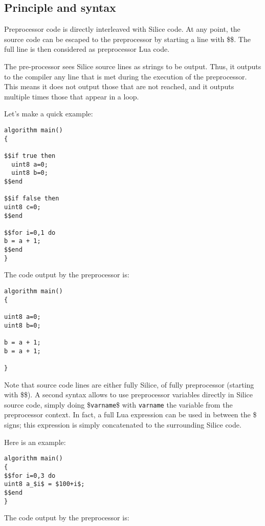 \documentclass[a4]{article}
\begin{document}
\subsection{Principle and syntax}

Preprocessor code is directly interleaved with Silice code. At any point, the source code can be escaped to the preprocessor by starting a line with \$\$. The full line is then considered as preprocessor Lua code. 

The pre-processor sees Silice source lines as strings to be output. 
Thus, it outputs to the compiler any line that is met during the execution
of the preprocessor. This means it does not output those that are not reached, and
it outputs multiple times those that appear in a loop.

Let's make a quick example:

\begin{verbatim}
algorithm main()
{

$$if true then
  uint8 a=0;
  uint8 b=0;
$$end

$$if false then
uint8 c=0;
$$end

$$for i=0,1 do
b = a + 1;
$$end
}
\end{verbatim}

The code output by the preprocessor is:

\begin{verbatim}
algorithm main()
{

uint8 a=0;
uint8 b=0;

b = a + 1;
b = a + 1;

}
\end{verbatim}

Note that source code lines are either fully Silice, of fully preprocessor (starting with \$\$). A second syntax allows to use preprocessor variables directly in Silice source code, simply doing \$\texttt{varname}\$ with \texttt{varname} the variable from the preprocessor context. In fact, a full Lua expression can be used in between the \$ signs; this expression is simply concatenated to the surrounding Silice code.

Here is an example:

\begin{verbatim}
algorithm main()
{
$$for i=0,3 do
uint8 a_$i$ = $100+i$;
$$end
}
\end{verbatim}

The code output by the preprocessor is:
\end{document}
